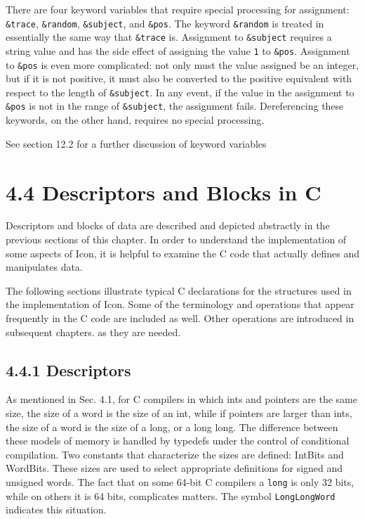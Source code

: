 There are four keyword variables that require special processing for
assignment: \texttt{\&trace}, \texttt{\&random}, \texttt{\&subject},
and \texttt{\&pos}. The keyword \texttt{\&random} is treated in
essentially the same way that \texttt{\&trace} is. Assignment to
\texttt{\&subject} requires a string value and has the side effect of
assigning the value \texttt{1} to \texttt{\&pos}. Assignment to
\texttt{\&pos} is even more complicated: not only must the value
assigned be an integer, but if it is not positive, it must also be
converted to the positive equivalent with respect to the length of
\texttt{\&subject}. In any event, if the value in the assignment to
\texttt{\&pos} is not in the range of \texttt{\&subject}, the
assignment fails. Dereferencing these keywords, on the other hand,
requires no special processing.

See section 12.2 for a further discussion of keyword variables

\section[4.4 Descriptors and Blocks in C]{4.4 Descriptors and Blocks in C}

Descriptors and blocks of data are described and depicted abstractly
in the previous sections of this chapter. In order to understand the
implementation of some aspects of Icon, it is helpful to examine the C
code that actually defines and manipulates data.

The following sections illustrate typical C declarations for the
structures used in the implementation of Icon. Some of the terminology
and operations that appear frequently in the C code are included as
well. Other operations are introduced in subsequent chapters. as they
are needed.

\subsection[4.4.1 Descriptors]{4.4.1 Descriptors}

As mentioned in Sec. 4.1, for C compilers in which ints and pointers
are the same size, the size of a word is the size of an int, while if
pointers are larger than ints, the size of a word is the size of a
long, or a long long. The difference between these models of memory is
handled by typedefs under the control of conditional compilation. Two
constants that characterize the sizes are defined: IntBits and
WordBits. These sizes are used to select appropriate definitions for
signed and unsigned words. The fact that on some 64-bit C compilers a
\texttt{long} is only 32 bits, while on others it is 64 bits,
complicates matters. The symbol \texttt{LongLongWord} indicates this
situation.

